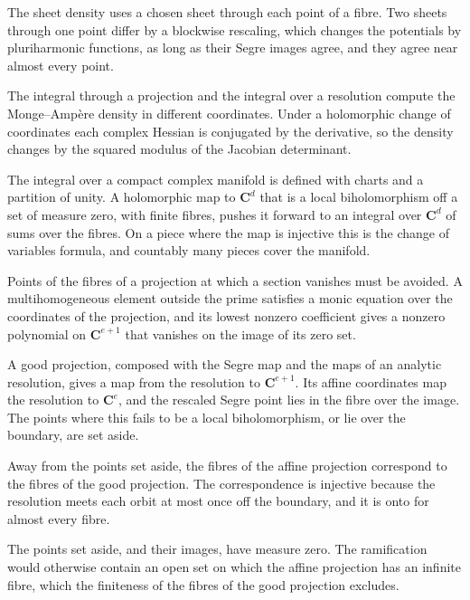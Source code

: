 The sheet density uses a chosen sheet through each point of a fibre. Two sheets through one point differ by a blockwise
rescaling, which changes the potentials by pluriharmonic functions, as long as their Segre images agree, and they agree
near almost every point.

The integral through a projection and the integral over a resolution compute the Monge--Amp\`ere density in different
coordinates. Under a holomorphic change of coordinates each complex Hessian is conjugated by the derivative, so the
density changes by the squared modulus of the Jacobian determinant.

The integral over a compact complex manifold is defined with charts and a partition of unity. A holomorphic map to
$\mathbf C^d$ that is a local biholomorphism off a set of measure zero, with finite fibres, pushes it forward to an
integral over $\mathbf C^d$ of sums over the fibres. On a piece where the map is injective this is the change of
variables formula, and countably many pieces cover the manifold.

Points of the fibres of a projection at which a section vanishes must be avoided. A multihomogeneous element outside the
prime satisfies a monic equation over the coordinates of the projection, and its lowest nonzero coefficient gives a
nonzero polynomial on $\mathbf C^{e+1}$ that vanishes on the image of its zero set.

A good projection, composed with the Segre map and the maps of an analytic resolution, gives a map from the resolution to
$\mathbf C^{e+1}$. Its affine coordinates map the resolution to $\mathbf C^e$, and the rescaled Segre point lies in the
fibre over the image. The points where this fails to be a local biholomorphism, or lie over the boundary, are set aside.

Away from the points set aside, the fibres of the affine projection correspond to the fibres of the good projection.
The correspondence is injective because the resolution meets each orbit at most once off the boundary, and it is onto
for almost every fibre.

The points set aside, and their images, have measure zero. The ramification would otherwise contain an open set on which
the affine projection has an infinite fibre, which the finiteness of the fibres of the good projection excludes.

